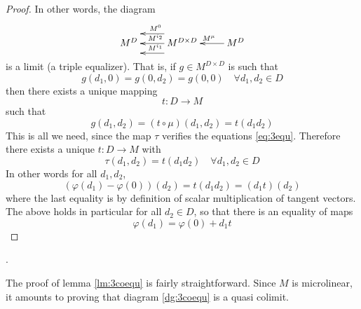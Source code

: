 \begin{proof}
  In other words, the diagram
  \begin{equation*}
    \xymatrix{
      M^D & M^{D\times D} \ar@<1em>[l]_{M^{i_1}} \ar[l]_{M^{i_2}} \ar@<-1em>[l]_{M^{0}} & M^D \ar[l]_{M^{\mu}} 
    }
  \end{equation*}
  is a limit (a triple equalizer). That is, if \( g\in M^{D\times D} \) is such that
  \begin{equation}
    g(d_1,0)=g(0,d_2)=g(0,0) \quad \forall d_1,d_2\in D
    \label{eq:3equ}
  \end{equation}
  then there exists a unique mapping 
  \begin{equation*}
    t:D\to M
  \end{equation*}
  such that
  \begin{equation*}
    g(d_1,d_2) = (t\circ \mu)(d_1,d_2) = t(d_1d_2)
  \end{equation*}
  This is all we need, since the map \( \tau \) verifies the equations \ref{eq:3equ}. Therefore there exists a unique \( t:D\to M \) with
  \begin{equation*}
    \tau(d_1,d_2)=t(d_1d_2) \quad \forall d_1,d_2\in D
  \end{equation*}
  In other words for all \( d_1,d_2 \),
  \begin{equation*}
    (\varphi(d_1) - \varphi(0))(d_2) = t(d_1d_2) = (d_1t)(d_2)
  \end{equation*}
  where the last equality is by definition of scalar multiplication of tangent vectors. The above holds in particular for all \( d_2\in D \), so that there is an equality of maps
  \begin{equation*}
    \varphi(d_1) = \varphi(0)+d_1t
  \end{equation*}
\end{proof}.

The proof of lemma \ref{lm:3coequ} is fairly straightforward. Since \( M \) is microlinear, it amounts to proving that diagram \ref{dg:3coequ} is a quasi colimit.

